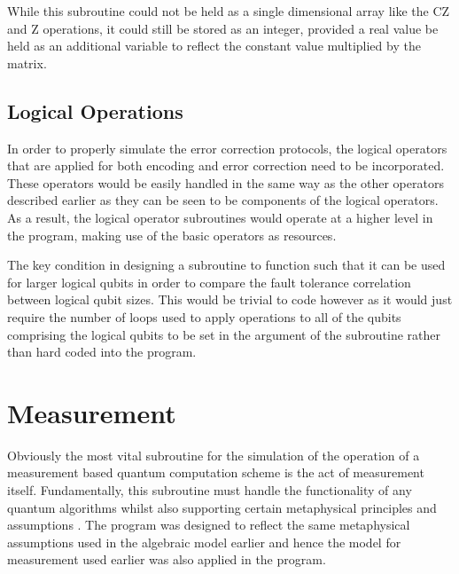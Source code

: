 While this subroutine could not be held as a single dimensional array like the CZ and Z operations, it could still be stored as an integer, provided a real value be held as an additional variable to reflect the constant value multiplied by the matrix.


\subsection{Logical Operations}

In order to properly simulate the error correction protocols, the logical operators that are applied for both encoding and error correction need to be incorporated. These operators would be easily handled in the same way as the other operators described earlier as they can be seen to be components of the logical operators. As a result, the logical operator subroutines would operate at a higher level in the program, making use of the basic operators as resources. 

The key condition in designing a subroutine to function such that it can be used for larger logical qubits in order to compare the fault tolerance correlation between logical qubit sizes. This would be trivial to code however as it would just require the number of loops used to apply operations to all of the qubits comprising the logical qubits to be set in the argument of the subroutine rather than hard coded into the program. 



\section{Measurement}

Obviously the most vital subroutine for the simulation of the operation of a measurement based quantum computation scheme is the act of measurement itself. Fundamentally, this subroutine must handle the functionality of any quantum algorithms whilst also supporting certain metaphysical principles and assumptions \citep{hagar_quantum_2011}. The program was designed to reflect the same metaphysical assumptions used in the algebraic model earlier and hence the model for measurement used earlier was also applied in the program.


